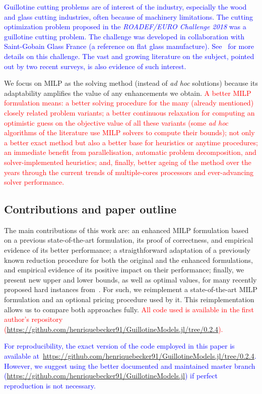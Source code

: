 \documentclass[smallextended]{svjour3}       %
\newif\iffinalversion
\newcommand{\newtext}[1]{\iffinalversion%
#1%
\else%
\textcolor{blue}{#1}%
\fi%
}
\newcommand{\oldtext}[1]{\iffinalversion%
\else%
\textcolor{red}{#1}%
\fi%
}
\begin{document}
\newtext{Guillotine cutting problems are of interest of the industry, especially the wood\cite{yanasse:linear:2008,morabito:hardboard:2007} and glass cutting industries\cite{clautiaux:2019,parreno:2020}, often because of machinery limitations. The cutting optimization problem proposed in the \emph{ROADEF/EURO Challenge 2018} was a guillotine cutting problem. The challenge was developed in collaboration with Saint-Gobain Glass France (a reference on flat glass manufacture). See~\cite{parreno:2020} for more details on this challenge. The vast and growing literature on the subject, pointed out by two recent surveys\cite{iori:2020,russo:2020}, is also evidence of such interest.}

We focus on MILP as the solving method (instead of \emph{ad hoc} solutions) because its adaptability amplifies the value of any enhancements we obtain.
\oldtext{
A better MILP formulation means:
a better solving procedure for the many (already mentioned) closely related problem variants;
a better continuous relaxation for computing an optimistic guess on the objective value of all these variants (some \emph{ad hoc} algorithms of the literature use MILP solvers to compute their bounds);
not only a better exact method but also a better base for heuristics or anytime procedures;
an immediate benefit from parallelisation, automatic problem decomposition, and solver-implemented heuristics;
and, finally, better ageing of the method over the years through the current trends of multiple-cores processors and ever-advancing solver performance.
}

\subsection{Contributions and paper outline}

The main contributions of this work are:
an enhanced MILP formulation based on a previous state-of-the-art formulation, its proof of correctness, and empirical evidence of its better performance;
a straigthforward adaptation of a previously known reduction procedure for both the original and the enhanced formulations, and empirical evidence of its positive impact on their performance;
finally, we present new upper and lower bounds, as well as optimal values, for many recently proposed hard instances from~\cite{velasco:2019}.
For such, we reimplement a state-of-the-art MILP formulation and an optional pricing procedure used by it.
This reimplementation allows us to compare both approaches fully.
\oldtext{All code used is available in the first author's repository ({\small\url{https://github.com/henriquebecker91/GuillotineModels.jl/tree/0.2.4}}).}
\newtext{For reproducibility, the exact version of the code employed in this paper is available at~{\small\url{https://github.com/henriquebecker91/GuillotineModels.jl/tree/0.2.4}}. However, we suggest using the better documented and maintained master branch ({\small\url{https://github.com/henriquebecker91/GuillotineModels.jl}}) if perfect reproduction is not necessary.}
\end{document}
